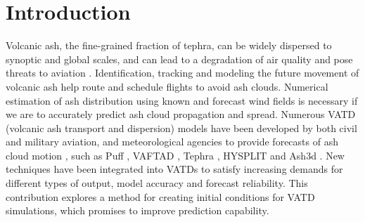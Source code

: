 \documentclass[utf8]{frontiersSCNS} %
\begin{document}
\section{Introduction}
Volcanic ash, the fine-grained fraction of tephra, can be widely dispersed to synoptic and global scales, and can lead to a degradation of air quality and pose threats to aviation \citep{tupper2007facing}. Identification, tracking and modeling the future movement of volcanic ash help route and schedule flights to avoid ash clouds. Numerical estimation of ash distribution using known and forecast wind fields is necessary if we are to accurately predict ash cloud propagation and spread. Numerous VATD (volcanic ash transport and dispersion) models have been developed by both civil and military aviation, and meteorological agencies to provide forecasts of ash cloud motion \citep{witham2007comparison}, such as Puff \citep{tanaka1991development,searcy1998puff}, VAFTAD \citep{heffter1993volcanic}, Tephra \citep{bonadonna2005probabilistic}, HYSPLIT\citep{stein2015noaa, rolph2017real} and Ash3d \citep{schwaiger2012ash3d}. New techniques have been integrated into VATDs to satisfy increasing demands for different types of output, model accuracy and forecast reliability. This contribution explores a method for creating initial conditions for VATD simulations, which promises to improve prediction capability.
\end{document}
